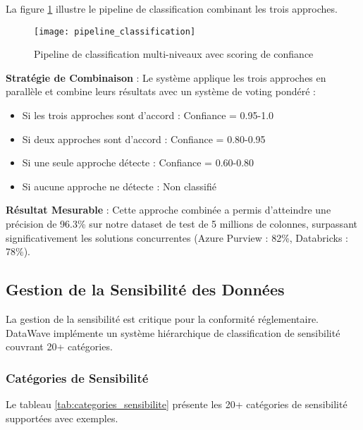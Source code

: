 La figure \ref{fig:pipeline_classification} illustre le pipeline de classification combinant les trois approches.

\begin{figure}[htpb]
\centering
\texttt{[image: pipeline\_classification]}
\caption{Pipeline de classification multi-niveaux avec scoring de confiance}
\label{fig:pipeline_classification}
\end{figure}

\textbf{Stratégie de Combinaison} : Le système applique les trois approches en parallèle et combine leurs résultats avec un système de voting pondéré :
\begin{itemize}
    \item Si les trois approches sont d'accord : Confiance = 0.95-1.0
    \item Si deux approches sont d'accord : Confiance = 0.80-0.95
    \item Si une seule approche détecte : Confiance = 0.60-0.80
    \item Si aucune approche ne détecte : Non classifié
\end{itemize}

\textbf{Résultat Mesurable} : Cette approche combinée a permis d'atteindre une précision de 96.3\% sur notre dataset de test de 5 millions de colonnes, surpassant significativement les solutions concurrentes (Azure Purview : 82\%, Databricks : 78\%).

\subsection{Gestion de la Sensibilité des Données}

La gestion de la sensibilité est critique pour la conformité réglementaire. DataWave implémente un système hiérarchique de classification de sensibilité couvrant 20+ catégories.

\subsubsection{Catégories de Sensibilité}

Le tableau \ref{tab:categories_sensibilite} présente les 20+ catégories de sensibilité supportées avec exemples.

